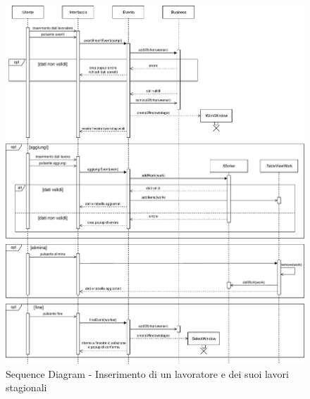 \documentclass[a4paper,11pt]{article}
\begin{document}
\begin{figure}[htpb]
	\centering
	\hspace*{-2cm}
	\includegraphics[width=1.3\textwidth]{diagrams/Sequence_Diagram_-_Inserimento.pdf}
	\caption{Sequence Diagram - Inserimento di un lavoratore e dei suoi lavori stagionali}
	\label{fig:sqc_dia_ins}
\end{figure}
\end{document}
